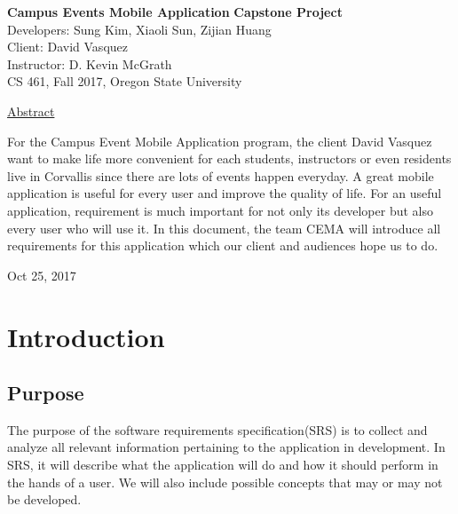 \documentclass[letterpaper, 10pt,titlepage]{article}
\newcommand\tab[1][1cm]{\hspace*{#1}}
\begin{document}
\begin{titlepage}
\begin{center}
    \Huge
    \textbf{Campus Events Mobile Application}
    \textbf{Capstone Project}\\
    \vspace{1.0cm}
    \large
    Developers: Sung Kim, Xiaoli Sun, Zijian Huang\\
    Client: David Vasquez\\
    \vspace{1.5cm}
    \large
    Instructor: D. Kevin McGrath\\

    \large
    CS 461, Fall 2017, Oregon State University\\    

    \vspace{3.2cm}

    \large
    \underline{Abstract}\\
    \vspace{0.3cm}
    \end{center}
    \large

    \tab For the Campus Event Mobile Application program, the client David Vasquez want to make life more convenient for each students, instructors or even residents live in Corvallis since there are lots of events happen everyday. A great mobile application is useful for every user and improve the quality of life. For an useful application, requirement is much important for not only its developer but also every user who will use it. In this document, the team CEMA will introduce all requirements for this application which our client and audiences hope us to do.
    
    \vspace{0.8cm}
    \vfill
    
\begin{center}    
    Oct 25, 2017

\end{center}
\end{titlepage}


\tableofcontents
\newpage



\section{Introduction}
\subsection{Purpose}
The purpose of the software requirements specification(SRS) is to collect and analyze all relevant information pertaining to the application in development. In SRS, it will describe what the application will do and how it should perform in the hands of a user. We will also include possible concepts that may or may not be developed.
\end{document}

